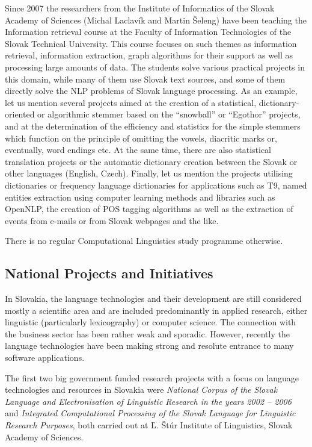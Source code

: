 \begin{multicols}{2}

Since 2007 the researchers from the Institute of Informatics of the Slovak Academy of Sciences (Michal Laclavík and Martin Šeleng) have been teaching the Information retrieval course\cite{f30} at the Faculty of Information Technologies of the Slovak Technical University. This course focuses on such themes as information retrieval, information extraction, graph algorithms for their support as well as processing large amounts of data. The students solve various practical projects in this domain, while many of them use Slovak text sources, and some of them directly solve the NLP problems of Slovak language processing. As an example, let us mention several projects aimed at the creation of a statistical, dictionary-oriented or algorithmic stemmer based on the  “snowball” or “Egothor” projects, and at the determination of the efficiency and statistics for the simple stemmers which function on the principle of omitting the vowels, diacritic marks or, eventually, word endings etc. At the same time, there are also statistical translation projects or the automatic dictionary creation between the Slovak or other languages (English, Czech). Finally, let us mention the projects utilising dictionaries or frequency language dictionaries for applications such as T9, named entities extraction using computer learning methods and libraries such as OpenNLP, the creation of POS tagging algorithms as well as the extraction of events from e-mails or from Slovak webpages and the like.

There is no regular Computational Linguistics study programme otherwise.

\subsection{National Projects and Initiatives}
In Slovakia, the language technologies and their development are still considered mostly a scientific
area and are included predominantly in applied research, either linguistic
(particularly lexicography) or computer science. The connection with the
business sector has been rather weak and sporadic. However, recently the
language technologies have been making strong and resolute entrance to many
software applications.

The first two big government funded research projects with a focus on language
technologies and resources in Slovakia were {\em National Corpus of the Slovak Language and
Electronisation of Linguistic Research in the years 2002 -- 2006} and {\em Integrated Computational
Processing of the Slovak Language for Linguistic Research Purposes}, both
carried out at Ľ. Štúr Institute of Linguistics, Slovak Academy of Sciences.


\end{multicols}
